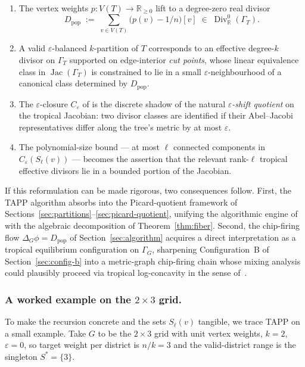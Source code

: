 \documentclass[11pt]{article}
\newcommand{\R}{\mathbb{R}}
\newcommand{\Div}{\operatorname{Div}^0}
\begin{document}
\begin{enumerate}
  \item The vertex weights $p : V(T) \to \R_{\geq 0}$ lift to a
    degree-zero real divisor
    \[
      D_{\mathrm{pop}} \;:=\; \sum_{v \in V(T)} \bigl(p(v) - 1/n\bigr) [v]
      \;\in\; \Div_\R(\Gamma_T).
    \]
  \item A valid $\varepsilon$-balanced $k$-partition of $T$ corresponds
    to an effective degree-$k$ divisor on $\Gamma_T$ supported on
    edge-interior \emph{cut points}, whose linear equivalence class in
    $\operatorname{Jac}(\Gamma_T)$ is constrained to lie in a small
    $\varepsilon$-neighbourhood of a canonical class determined by
    $D_{\mathrm{pop}}$.
  \item The $\varepsilon$-closure $C_\varepsilon$ of
    \cite[Definition~C.2]{akitaya2026bud} is the discrete shadow of
    the natural \emph{$\varepsilon$-shift quotient} on the tropical
    Jacobian: two divisor classes are identified if their Abel--Jacobi
    representatives differ along the tree's metric by at most
    $\varepsilon$.
  \item The polynomial-size bound \cite[Lemma~C.8]{akitaya2026bud} ---
    at most $\ell$ connected components in $C_\varepsilon(S_\ell(v))$ ---
    becomes the assertion that the relevant rank-$\ell$ tropical
    effective divisors lie in a bounded portion of the Jacobian.
\end{enumerate}

\noindent If this reformulation can be made rigorous, two consequences
follow. First, the TAPP algorithm absorbs into the Picard-quotient
framework of Sections~\ref{sec:partitions}--\ref{sec:picard-quotient},
unifying the algorithmic engine of \cite{akitaya2026bud} with the
algebraic decomposition of Theorem~\ref{thm:fiber}. Second, the
chip-firing flow $\Delta_G \phi = D_{\mathrm{pop}}$ of
Section~\ref{sec:algorithm} acquires a direct interpretation as a
tropical equilibrium configuration on $\Gamma_G$, sharpening
Configuration~B of Section~\ref{sec:config-b} into a metric-graph
chip-firing chain whose mixing analysis could plausibly proceed via
tropical log-concavity in the sense of~\cite{anari2021logconcave}.

\subsubsection*{A worked example on the $2 \times 3$ grid.}

To make the recursion concrete and the sets $S_\ell(v)$ tangible, we
trace TAPP on a small example. Take $G$ to be the $2 \times 3$ grid
with unit vertex weights, $k = 2$, $\varepsilon = 0$, so target weight
per district is $n/k = 3$ and the valid-district range is the singleton
$S^* = \{3\}$.
\end{document}
